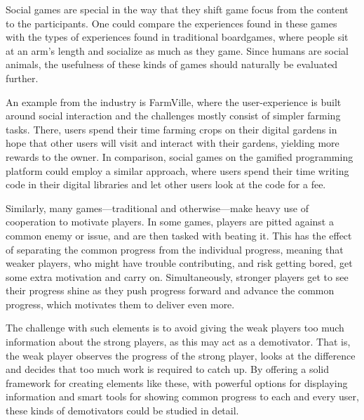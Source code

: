 \label{sec:social}
Social games are special in the way that they shift game focus from the content to the participants. One could compare the experiences found in these games with the types of experiences found in traditional boardgames, where people sit at an arm's length and socialize as much as they game. Since humans are social animals, the usefulness of these kinds of games should naturally be evaluated further.

An example from the industry is FarmVille\cite{farmville}, where the user-experience is built around social interaction and the challenges mostly consist of simpler farming tasks. There, users spend their time farming crops on their digital gardens in hope that other users will visit and interact with their gardens, yielding more rewards to the owner. In comparison, social games on the gamified programming platform could employ a similar approach, where users spend their time writing code in their digital libraries and let other users look at the code for a fee.

Similarly, many games---traditional and otherwise---make heavy use of cooperation to motivate players. In some games, players are pitted against a common enemy or issue, and are then tasked with beating it. This has the effect of separating the common progress from the individual progress, meaning that weaker players, who might have trouble contributing, and risk getting bored, get some extra motivation and carry on. Simultaneously, stronger players get to see their progress shine as they push progress forward and advance the common progress, which motivates them to deliver even more.

The challenge with such elements is to avoid giving the weak players too much information about the strong players, as this may act as a demotivator. That is, the weak player observes the progress of the strong player, looks at the difference and decides that too much work is required to catch up. By offering a solid framework for creating elements like these, with powerful options for displaying information and smart tools for showing common progress to each and every user, these kinds of demotivators could be studied in detail.
